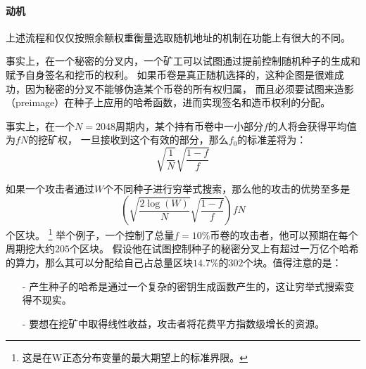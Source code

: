 \documentclass[letterpaper]{article}
\begin{document}
\paragraph{动机}
上述流程和仅仅按照余额权重衡量选取随机地址的机制在功能上有很大的不同。

事实上，在一个秘密的分叉内，一个矿工可以试图通过提前控制随机种子的生成和赋予自身签名和挖币的权利。
如果币卷是真正随机选择的，这种企图是很难成功，因为秘密的分叉不能够伪造某个币卷的所有权归属，
而且必须要试图来造影（preimage）在种子上应用的哈希函数，进而实现签名和造币权利的分配。

事实上，在一个$N=\num{2048}$周期内，某个持有币卷中一小部分$f$的人将会获得平均值为$f N$的挖矿权，
一旦接收到这个有效的部分，那么$f_0$的标准差将为：$$\sqrt{\frac{1}{N}}\sqrt{\frac{1-f}{f}}$$

如果一个攻击者通过$W$个不同种子进行穷举式搜索，那么他的攻击的优势至多是$$\left(\sqrt{\frac{2\log(W)}{N}}\sqrt{\frac{1-f}{f}}\right)fN$$个区块。
\footnote{这是在W正态分布变量的最大期望上的标准界限。}
举个例子，一个控制了总量$f = 10\%$币卷的攻击者，他可以预期在每个周期挖大约$205$个区块。
假设他在试图控制种子的秘密分叉上有超过一万亿个哈希的算力，那么其可以分配给自己占总量区块$14.7\%$的$302$个块。值得注意的是：
\begin{itemize}
\item[-] %
产生种子的哈希是通过一个复杂的密钥生成函数产生的，这让穷举式搜索变得不现实。
\item[-] %
要想在挖矿中取得线性收益，攻击者将花费平方指数级增长的资源。
\end{itemize}
\end{document}
